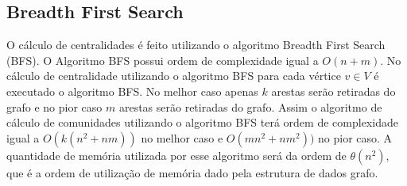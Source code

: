 \subsection{Breadth First Search}\label{sec:bfs}
O cálculo de centralidades é feito utilizando o algoritmo Breadth First Search (BFS). O Algoritmo BFS
possui ordem de complexidade igual a $O(n + m)$. No cálculo de centralidade utilizando o algoritmo BFS
para cada vértice $v \in V$ é executado o algoritmo BFS. No melhor caso apenas $k$ arestas serão retiradas do grafo e no pior
caso $m$ arestas serão retiradas do grafo. Assim o algoritmo de cálculo de comunidades utilizando o algoritmo BFS terá ordem de complexidade igual a $O(k(n^2 + nm))$ no melhor caso e $O(mn^2 + nm^2))$ no pior caso. A quantidade
de memória utilizada por esse algoritmo será da ordem de $\theta(n^2)$, que é a ordem de utilização de memória dado pela estrutura
de dados grafo.